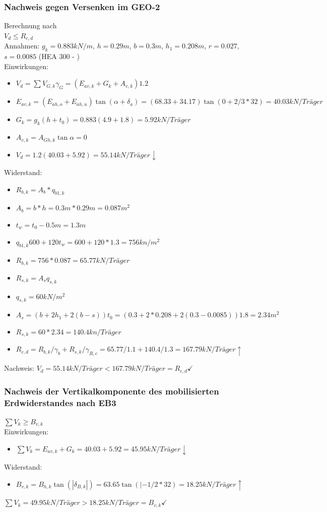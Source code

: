 \documentclass[11pt,fleqn,a4paper,halfparskip]{article}
\begin{document}
\subsubsection{Nachweis gegen Versenken im GEO-2}
Berechnung nach \cite[S.138]{wsp}\\
$V_d \le R_{c,d}$\\
Annahmen: $g_k = 0.883kN/m$, $h=0.29m$, $b=0.3m$, $h_1 = 0.208m$, $r = 0.027$, $s=0.0085$ (HEA 300 - \cite{schneider})\\
Einwirkungen:
\begin{itemize}
\item[] $V_d = \sum V_{G,k}\gamma_G = (E_{av,k} + G_k + A_{v,k})1.2$
\item[] $E_{av,k} = (E_{ah,o}+E_{ah,u})\tan(\alpha + \delta_a) = (68.33 + 34.17) \tan(0 + 2/3*32) = 40.03kN/Träger$
\item[] $G_k = g_k(h+t_0) = 0.883(4.9+1.8) = 5.92kN/Träger$
\item[] $A_{v,k} = A_{Gh,k}\tan\alpha = 0$
\item[] $V_d = 1.2(40.03 + 5.92) = 55.14kN/Träger\downarrow$
\end{itemize}
Widerstand:
\begin{itemize}
\item[] $R_{b,k} = A_b*q_{b1,k} $
\item[] $A_b = b*h = 0.3m*0.29m = 0.087m^2$
\item[] $t_w = t_0 - 0.5m = 1.3m$
\item[] $q_{b1,k} 600+120t_w = 600 + 120*1.3 = 756kn/m^2$
\item[] $R_{b,k} = 756 * 0.087 = 65.77kN/Träger$
\end{itemize}
\newpage
\begin{itemize}
\item[] $R_{s,k} = A_s q_{s,k}$
\item[] $q_{s,k} = 60kN/m^2$
\item[] $A_s = (b + 2h_1 + 2(b-s))t_0 = (0.3 + 2*0.208 + 2(0.3-0.0085))1.8 = 2.34m^2$
\item[] $R_{s,k} = 60*2.34 = 140.4 kn/Träger$
\item[] $R_{c,d} = R_{b,k} / \gamma_b + R_{s,k} / \gamma_{R,e} = 65.77/1.1 + 140.4/1.3 = 167.79kN/Träger\uparrow$
\end{itemize}
Nachweis: $V_d = 55.14kN/Träger < 167.79kN/Träger = R_{c,d}\checkmark$
\subsubsection{Nachweis der Vertikalkomponente des mobilisierten Erdwiderstandes nach EB3}
$\sum V_k \ge B_{v,k}$\\
Einwirkungen:
\begin{itemize}
\item[] $\sum V_k = E_{av,k} + G_k = 40.03 + 5.92 = 45.95kN/Träger \downarrow$
\end{itemize}
Widerstand:
\begin{itemize}
\item[] $B_{v,k} = B_{h,k}\tan(|\delta_{B,k}|) = 63.65\tan(|-1/2*32) = 18.25kN/Träger\uparrow$
\end{itemize}
$\sum V_k = 49.95kN/Träger > 18.25kN/Träger = B_{v,k}\checkmark$
\end{document}
